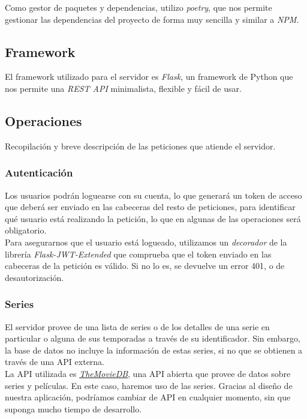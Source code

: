 Como gestor de paquetes y dependencias, utilizo \textit{poetry}\cite{poetry}, que nos permite gestionar las dependencias
del proyecto de forma muy sencilla y similar a \textit{NPM}\cite{npm}.

\subsection{Framework}
El framework utilizado para el servidor es \textit{Flask}\cite{flask}, un framework de Python que nos permite una 
\textit{REST API}\cite{rest} minimalista, flexible y fácil de usar.

\subsection{Operaciones}
Recopilación y breve descripción de las peticiones que atiende el servidor.

\subsubsection{Autenticación}
Los usuarios podrán loguearse con su cuenta, lo que generará un token de acceso que deberá ser enviado en las cabeceras
del resto de peticiones, para identificar qué usuario está realizando la petición, lo que en algunas de las operaciones
será obligatorio.\\

Para asegurarnos que el usuario está logueado, utilizamos un \textit{decorador} de la librería
\textit{Flask-JWT-Extended}\cite{jwt} que comprueba que el token enviado en las cabeceras de la petición es válido. Si
no lo es, se devuelve un error 401, o de desautorización.\\

\subsubsection{Series}
El servidor provee de una lista de series o de los detalles de una serie en particular o alguna de sus temporadas a
través de su identificador. Sin embargo, la base de datos no incluye la información de estas series, si no que se
obtienen a través de una API externa.\\

La API utilizada es \href{https://www.themoviedb.org}{\textit{TheMovieDB}}, una API abierta que provee de datos sobre
series y películas. En este caso, haremos uso de las series. Gracias al diseño de nuestra aplicación, podríamos cambiar
de API en cualquier momento, sin que suponga mucho tiempo de desarrollo.

